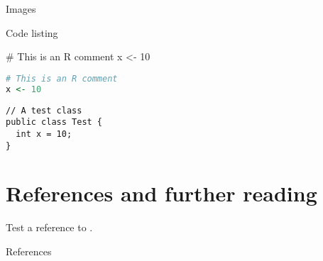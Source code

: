 \lipsum[3]

\begin{frame}{Images}


\end{frame}

\lipsum[4]

\begin{frame}[fragile]{Code listing}

\begin{rcode}
# This is an R comment
x <- 10
\end{rcode}

\begin{lstlisting}[language=R]
# This is an R comment
x <- 10
\end{lstlisting}

\begin{lstlisting}
// A test class
public class Test {
  int x = 10;
}

\end{lstlisting}
\end{frame}


\section*{References and further reading}
Test a reference to \citep{Tantau_2004}.

\begin{frame}[allowframebreaks]{References} 
\scriptsize


\end{frame}



